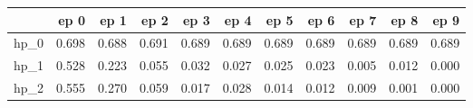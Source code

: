 \begin{tabular}{lrrrrrrrrrr}
\toprule
{} &   ep 0 &   ep 1 &   ep 2 &   ep 3 &   ep 4 &   ep 5 &   ep 6 &   ep 7 &   ep 8 &   ep 9 \\
\midrule
hp\_0 &  0.698 &  0.688 &  0.691 &  0.689 &  0.689 &  0.689 &  0.689 &  0.689 &  0.689 &  0.689 \\
hp\_1 &  0.528 &  0.223 &  0.055 &  0.032 &  0.027 &  0.025 &  0.023 &  0.005 &  0.012 &  0.000 \\
hp\_2 &  0.555 &  0.270 &  0.059 &  0.017 &  0.028 &  0.014 &  0.012 &  0.009 &  0.001 &  0.000 \\
\bottomrule
\end{tabular}
